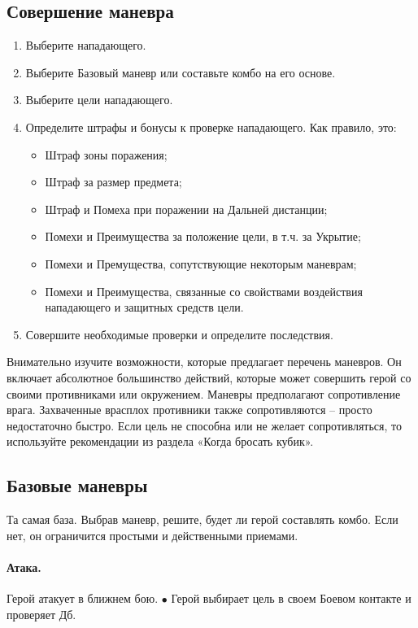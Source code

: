 \subsection{Совершение маневра}
\begin{enumerate}
  \item Выберите нападающего.
  \item Выберите Базовый маневр или составьте комбо на его основе.
  \item Выберите цели нападающего.
  \item Определите штрафы и бонусы к проверке нападающего. Как правило, это:
    \begin{itemize}
      \item Штраф зоны поражения;
      \item Штраф за размер предмета;
      \item Штраф и Помеха при поражении на Дальней дистанции;
      \item Помехи и Преимущества за положение цели, в т.ч. за Укрытие;
      \item Помехи и Премущества, сопутствующие некоторым маневрам;
      \item Помехи и Преимущества, связанные со свойствами воздействия нападающего и защитных средств цели.
    \end{itemize}
  \item Совершите необходимые проверки и определите последствия. 
\end{enumerate}
\begin{tcolorbox}
  Внимательно изучите возможности, которые предлагает перечень маневров. Он включает абсолютное большинство действий, которые может совершить герой со своими противниками или окружением.
  \newline Маневры предполагают сопротивление врага. Захваченные врасплох противники также сопротивляются – просто недостаточно быстро. Если цель не способна или не желает сопротивляться, то используйте рекомендации из раздела «Когда бросать кубик».
\end{tcolorbox}

\subsection{Базовые маневры}
Та самая база. Выбрав маневр, решите, будет ли герой составлять комбо. Если нет, он ограничится простыми и действенными приемами. 
\paragraph{Атака.} Герой атакует в ближнем бою.
$\bullet$ Герой выбирает цель в своем Боевом контакте и проверяет Дб.

